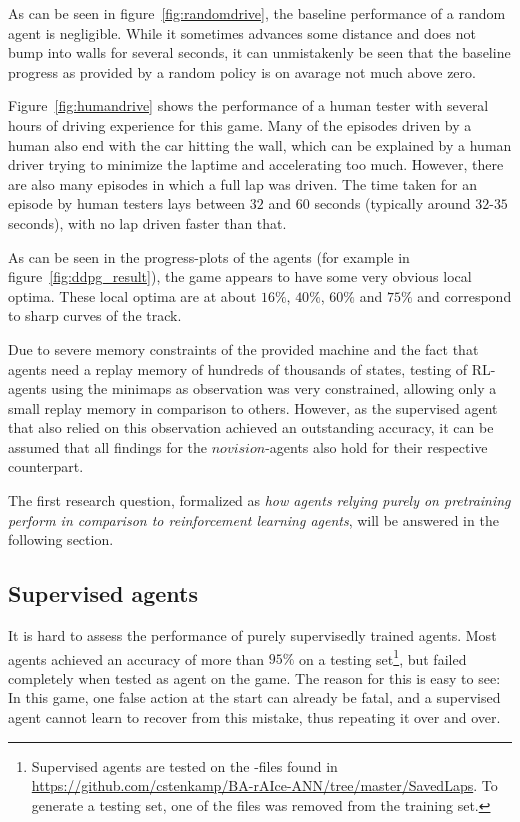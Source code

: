 As can be seen in figure~\ref{fig:randomdrive}, the baseline performance of a random agent is negligible. While it sometimes advances some distance and does not bump into walls for several seconds, it can unmistakenly be seen that the baseline progress as provided by a random policy is on avarage not much above zero.

Figure~\ref{fig:humandrive} shows the performance of a human tester with several hours of driving experience for this game. Many of the episodes driven by a human also end with the car hitting the wall, which can be explained by a human driver trying to minimize the laptime and accelerating too much. However, there are also many episodes in which a full lap was driven. The time taken for an episode by human testers lays between $32$ and $60$ seconds (typically around $32$-$35$ seconds), with no lap driven faster than that.

As can be seen in the progress-plots of the agents (for example in figure~\ref{fig:ddpg_result}), the game appears to have some very obvious local optima. These local optima are at about $16\%$, $40\%$, $60\%$ and $75\%$ and correspond to sharp curves of the track.

Due to severe memory constraints of the provided machine and the fact that agents need a replay memory of hundreds of thousands of states, testing of RL-agents using the minimaps as observation was very constrained, allowing only a small replay memory in comparison to others. However, as the supervised agent that also relied on this observation achieved an outstanding accuracy, it can be assumed that all findings for the $novision$-agents also hold for their respective counterpart.

The first research question, formalized as \textit{how agents relying purely on pretraining perform in comparison to reinforcement learning agents}, will be answered in the following section.

\subsection{Supervised agents}
\label{sec:resultsupervised}

It is hard to assess the performance of purely supervisedly trained agents. Most agents achieved an accuracy of more than $95\%$ on a testing set\footnote{Supervised agents are tested on the -files found in \url{https://github.com/cstenkamp/BA-rAIce-ANN/tree/master/SavedLaps}. To generate a testing set, one of the files was removed from the training set.}, but failed completely when tested as agent on the game. The reason for this is easy to see: In this game, one false action at the start can already be fatal, and a supervised agent cannot learn to recover from this mistake, thus repeating it over and over.

